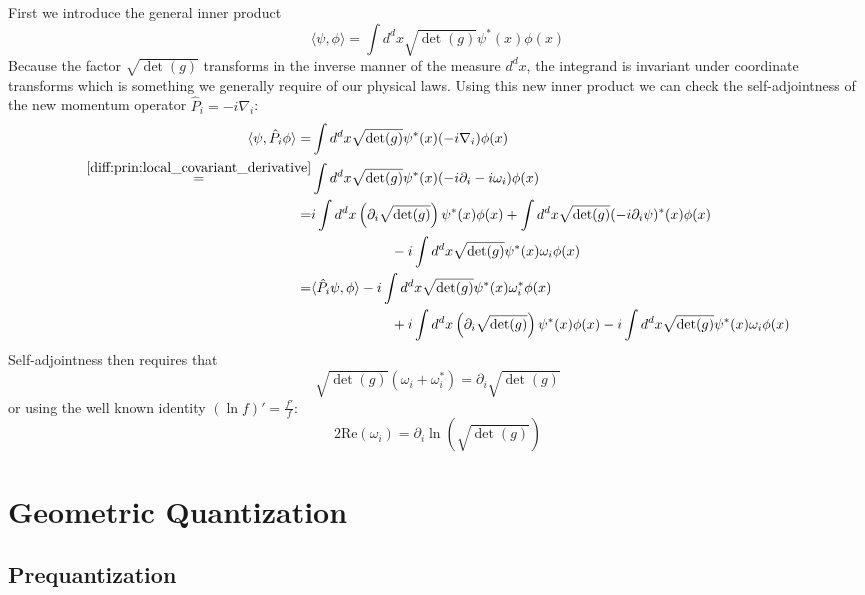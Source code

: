 \begin{construct}
		First we introduce the general inner product
		\begin{equation}
			\langle\psi, \phi\rangle = \int d^dx\sqrt{\det(g)}\psi^*(x)\phi(x)
		\end{equation}
		Because the factor $\sqrt{\det(g)}$ transforms in the inverse manner of the measure $d^dx$, the integrand is invariant under coordinate transforms which is something we generally require of our physical laws. Using this new inner product we can check the self-adjointness of the new momentum operator $\hat{P}_i = -i\nabla_i$:
		\begin{align*}
			\langle\psi, \hat{P}_i\phi\rangle = &\int d^dx\sqrt{\det(g)}\psi^*(x)(-i\nabla_i)\phi(x)\\
			\overset{\ref{diff:prin:local_covariant_derivative}}{=} &\int d^dx\sqrt{\det(g)}\psi^*(x)(-i\partial_i - i\omega_i)\phi(x)\\
			= &i\int d^dx\left(\partial_i\sqrt{\det(g)}\right)\psi^*(x)\phi(x) + \int d^dx\sqrt{\det(g)}(-i\partial_i\psi)^*(x)\phi(x)\\
				&\hspace{2cm} -i \int d^dx\sqrt{\det(g)}\psi^*(x)\omega_i\phi(x)\\
			= &\langle\hat{P}_i\psi, \phi\rangle -i \int d^dx\sqrt{\det(g)}\psi^*(x)\omega_i^*\phi(x)\\
				&\hspace{2cm} + i\int d^dx\left(\partial_i\sqrt{\det(g)}\right)\psi^*(x)\phi(x) -i \int d^dx\sqrt{\det(g)}\psi^*(x)\omega_i\phi(x)
		\end{align*}
		Self-adjointness then requires that
		\begin{equation}
			\sqrt{\det(g)}(\omega_i + \omega_i^*) = \partial_i\sqrt{\det(g)}
		\end{equation}
		or using the well known identity $(\ln f)' = \frac{f'}{f}$:
		\begin{equation}
			2\text{Re}(\omega_i) = \partial_i\ln\left(\sqrt{\det(g)}\right)
		\end{equation}
	\end{construct}
	
\section{Geometric Quantization}

\subsection{Prequantization}\label{section:geometric_quantization}

